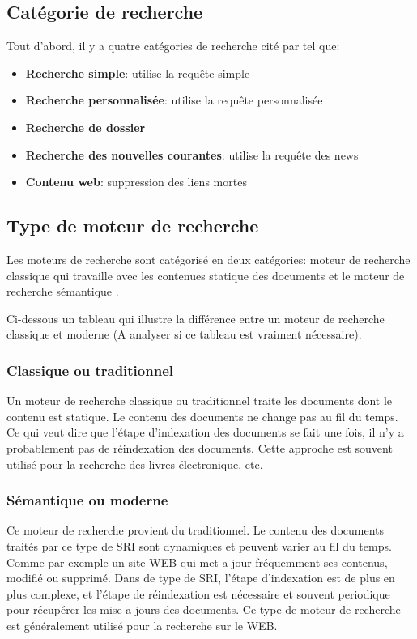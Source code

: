 \subsection{Catégorie de recherche}
Tout d'abord, il y a quatre catégories de recherche cité par \citeauthor{ir-on-web} \citep{ir-on-web} tel que:
\begin{itemize}
	\item \textbf{Recherche simple}: utilise la requête simple
	\item \textbf{Recherche personnalisée}: utilise la requête personnalisée
	\item \textbf{Recherche de dossier}
	\item \textbf{Recherche des nouvelles courantes}: utilise la requête des news
	\item \textbf{Contenu web}: suppression des liens mortes
\end{itemize}

\subsection{Type de moteur de recherche}
Les moteurs de recherche sont catégorisé en deux catégories: moteur de recherche classique qui travaille avec les contenues statique des documents et le moteur de recherche sémantique \citep*{approche-semantique,thesaurus-ir-web}.

Ci-dessous un tableau qui illustre la différence entre un moteur de recherche classique et moderne \citep{ir-on-web} (A analyser si ce tableau est vraiment nécessaire).

\subsubsection{Classique ou traditionnel}
Un moteur de recherche classique ou traditionnel traite les documents dont le contenu est statique. Le contenu des documents ne change pas au fil du temps. Ce qui veut dire que l'étape d'indexation des documents se fait une fois, il n'y a probablement pas de réindexation des documents. Cette approche est souvent utilisé pour la recherche des livres électronique, etc.

\subsubsection{Sémantique ou moderne}
Ce moteur de recherche provient du traditionnel. Le contenu des documents traités par ce type de SRI sont dynamiques et peuvent varier au fil du temps. Comme par exemple un site WEB qui met a jour fréquemment ses contenus, modifié ou supprimé. Dans de type de SRI, l'étape d'indexation est de plus en plus complexe, et l'étape de réindexation est nécessaire et souvent periodique pour récupérer les mise a jours des documents. Ce type de moteur de recherche est généralement utilisé pour la recherche sur le WEB.

